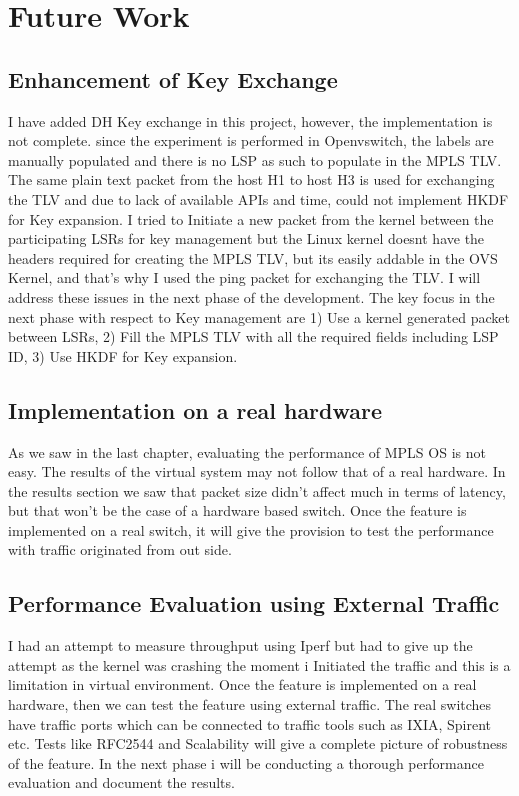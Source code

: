 \chapter{Future Work}
\section{Enhancement of Key Exchange}

I have added DH Key exchange in this project, however, the implementation is not complete. since the experiment is performed in Openvswitch, the labels are manually populated and there is no LSP as such to populate in the MPLS TLV. The same plain text packet from the host H1 to host H3 is used for exchanging the TLV and due to lack of available APIs and time, could not implement HKDF for Key expansion. I tried to Initiate a new packet from the kernel between the participating LSRs for key management but the Linux kernel doesnt have the headers required for creating the MPLS TLV, but its easily addable in the OVS Kernel, and that's why I used the ping packet for exchanging the TLV. I will address these issues in the next phase of the development. The key focus in the next phase with respect to Key management are 1) Use a kernel generated packet between LSRs, 2) Fill the MPLS TLV with all the required fields including LSP ID, 3) Use HKDF for Key expansion.



\section{Implementation on a real hardware}
As we saw in the last chapter, evaluating the performance of MPLS OS is not easy. The results of the virtual system may not follow that of a real hardware. In the results section we saw that packet size didn't affect much in terms of latency, but that won't be the case of a hardware based switch. Once the feature is implemented on a real switch, it will give the provision to test the performance with traffic originated from out side. 


\section{Performance Evaluation using External Traffic}

I had an attempt to measure throughput using Iperf but had to give up the attempt as the kernel was crashing the moment i Initiated the traffic and this is a limitation in virtual environment. Once the feature is implemented on a real hardware, then we can test the feature using external traffic. The real switches have traffic ports which can be connected to traffic tools such as IXIA, Spirent etc. Tests like RFC2544 and Scalability will give a complete picture of robustness of the feature. In the next phase i will be conducting a thorough performance evaluation and document the results.



